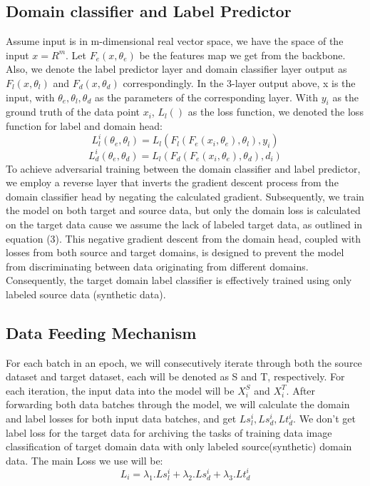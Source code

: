 \documentclass[nonacm, sigconf]{acmart}
\begin{document}
\subsection{Domain classifier and Label Predictor}
\noindent Assume input is in m-dimensional real vector space, we have the space of the input \(x = R^m\). Let \(F_e(x, \theta_e)\) be the features map we get from the backbone. Also, we denote the label predictor layer and domain classifier layer output as \(F_l(x, \theta_l)\) and \(F_d(x, \theta_d)\) correspondingly. In the 3-layer output above, x is the input, with \(\theta_e, \theta_l, \theta_d\) as the parameters of the corresponding layer. With \(y_i\) as the ground truth of the data point \(x_i\), \(L_l()\) as the loss function, we denoted the loss function for label and domain head:
\begin{equation}
  L_l^i(\theta_e, \theta_l) = L_l(F_l(F_e(x_i, \theta_e), \theta_l), y_i)
\end{equation}
\begin{equation}
  L_d^i(\theta_e, \theta_d) = L_l(F_d(F_e(x_i, \theta_e), \theta_d), d_i)
\end{equation}
\noindent To achieve adversarial training between the domain classifier and label predictor, we employ a reverse layer that inverts the gradient descent process from the domain classifier head by negating the calculated gradient. Subsequently, we train the model on both target and source data, but only the domain loss is calculated on the target data cause we assume the lack of labeled target data, as outlined in equation (3). This negative gradient descent from the domain head, coupled with losses from both source and target domains, is designed to prevent the model from discriminating between data originating from different domains. Consequently, the target domain label classifier is effectively trained using only labeled source data (synthetic data).
\subsection{Data Feeding Mechanism}
\noindent For each batch in an epoch, we will consecutively iterate through both the source dataset and target dataset, each will be denoted as S and T, respectively. For each iteration, the input data into the model will be \(X^S_i\) and \(X^T_i\). After forwarding both data batches through the model, we will calculate the domain and label losses for both input data batches, and get \(Ls_l^i, Ls_d^i, Lt_d^i\). We don't get label loss for the target data for archiving the tasks of training data image classification of target domain data with only labeled source(synthetic) domain data.
The main Loss we use will be:
\begin{equation}
  L_i = \lambda_1.Ls_l^i + \lambda_2.Ls_d^i + \lambda_3.Lt_d^i
\end{equation}
\end{document}
